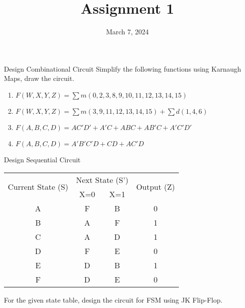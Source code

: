 \documentclass{vhdl-assignment}
\title{Assignment 1}
\date{March 7, 2024}
\begin{document}
\maketitle
\thispagestyle{fancy}

\begin{problem}{Design Combinational Circuit}
    Simplify the following functions using Karnaugh Maps, draw the circuit.
    \begin{enumerate}
        \item$F(W,X,Y,Z)=\sum m(0,2,3,8,9,10,11,12,13,14,15)$
        \item$F(W,X,Y,Z)=\sum m(3,9,11,12,13,14,15) + \sum d(1,4,6)$
        \item$F(A,B,C,D)=AC'D'+A'C+ABC+AB'C+A'C'D'$
        \item$F(A,B,C,D)=A'B'C'D+CD+AC'D$
    \end{enumerate}
\end{problem}

\begin{problem}{Design Sequential Circuit}
    \begin{center}
        \begin{tabular}{|c|cc|c|}
            \hline
            \multirow{2}{*}{Current State (S)} & \multicolumn{2}{c|}{Next State (S')} & \multirow{2}{*}{Output (Z)}     \\ \cline{2-3}
                                               & \multicolumn{1}{c|}{X=0}             & X=1                         &   \\ \hline
            A                                  & \multicolumn{1}{c|}{F  }             & B                           & 0 \\ \hline
            B                                  & \multicolumn{1}{c|}{A  }             & F                           & 1 \\ \hline
            C                                  & \multicolumn{1}{c|}{A  }             & D                           & 1 \\ \hline
            D                                  & \multicolumn{1}{c|}{F  }             & E                           & 0 \\ \hline
            E                                  & \multicolumn{1}{c|}{D  }             & B                           & 1 \\ \hline
            F                                  & \multicolumn{1}{c|}{D  }             & E                           & 0 \\ \hline
        \end{tabular}
    \end{center}
    
    For the given state table, design the circuit for FSM using JK Flip-Flop.
\end{problem}
\end{document}
